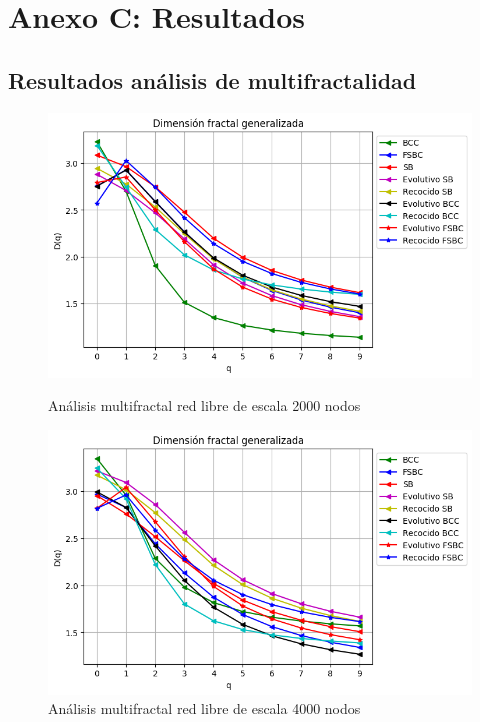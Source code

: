 \newpage
\section*{Anexo C: Resultados}
 \label{AnexoC}

\subsection*{Resultados análisis de multifractalidad}


\begin{figure}[!htb]
    \begin{minipage}{0.48\textwidth}
        \centering
        \includegraphics[scale=0.5]{CapituloAAnexos/imagenesAnexoC/Fractalidad/grafica_Dq20180502_203759ScaleFree2000Nodes.png}
        \caption{Análisis multifractal red libre de escala 2000 nodos}
    \end{minipage}\hfill
   \begin{minipage}{0.48\textwidth}
         \centering
        \includegraphics[scale=0.5]{CapituloAAnexos/imagenesAnexoC/Fractalidad/grafica_Dq20180506_035455ScaleFree4000Nodes.png}
    \caption{Análisis multifractal red libre de escala 4000 nodos}
    \end{minipage}
\end{figure}

